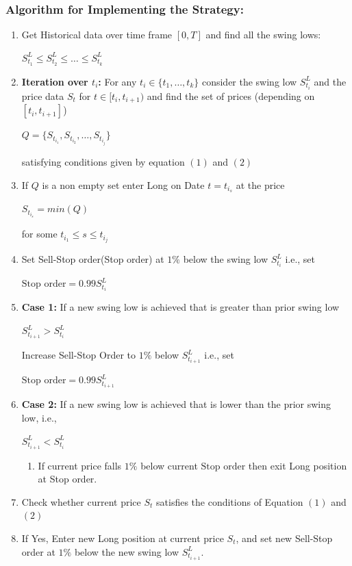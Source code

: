 \documentclass[slidestop,compress,mathserif,9pt]{beamer}
\def\b{\begin{center}}
\def\e{\end{center}}
\def\be{\begin{enumerate}}
\def\ee{\end{enumerate}}
\begin{document}
\begin{frame}[allowframebreaks]

\frametitle{Algorithm for Implementing the Strategy:}

\be
\item
Get Historical data over time frame $[0,T]$ and find all the swing lows:
\begin{center} $S_{t_1}^L \le S_{t_2}^L \le \ldots \le S_{t_k}^L$  \end{center}
\item
\textbf{Iteration over $t_i$:} For any $t_i \in \lbrace t_1,\ldots,t_k \rbrace$ consider the swing low $S_{t_i}^L$ and the price data $S_t$ for $t \in [t_i,t_{i+1})$ and find the set of prices (depending on $[t_i,t_{i+1}]$)
\begin{center}
$Q = \lbrace S_{t_{i_1}},S_{t_{i_2}},\ldots,S_{t_{i_j}}  \rbrace$
\end{center} 
satisfying conditions given by equation $(1)$ and $(2)$
\item
If $Q$ is a non empty set enter Long on Date $t=t_{i_s}$ at the price
\begin{center}
$S_{t_{i_s}} = min(Q)$
\end{center}
for some $t_{i_1} \le s \le t_{i_j}$
\item
Set Sell-Stop order(Stop order) at  $ 1\% $ below the swing low $S_{t_i}^L$ i.e., set
\b $\mbox{Stop order} = 0.99 S_{t_i}^L$\e



\framebreak

\item

\textbf{Case 1:} If a new swing low is achieved that is greater than prior swing low \b$S_{t_{i+1}}^L > S_{t_{i}}^L$ \e
Increase Sell-Stop Order to $1\%$ below $S_{t_{i+1}}^L$ i.e., set
\b $\mbox{Stop order} = 0.99 S_{t_{i+1}}^L$  \e
\item
\textbf{Case 2:} If a new swing low is achieved that is lower than the prior swing low, i.e., \b $S_{t_{i+1}}^L < S_{t_i}^L$   \e
\be
\item
If current price falls $1\%$ below current $\mbox{Stop order}$ then exit Long position at Stop order.
\ee
\item
Check whether current price $S_t$ satisfies the conditions of Equation $(1)$ and $(2)$
\item
If Yes, Enter new Long position at current price $S_t$, and set new Sell-Stop order at $1\%$ below the new swing low $S_{t_{i+1}}^L$.

\ee

\end{frame}
\end{document}
